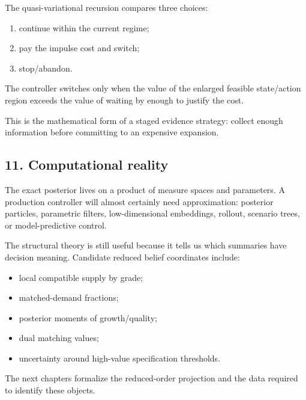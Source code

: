 The quasi-variational recursion compares three choices:

\begin{enumerate}
\def\labelenumi{\arabic{enumi}.}
\tightlist
\item
  continue within the current regime;
\item
  pay the impulse cost and switch;
\item
  stop/abandon.
\end{enumerate}

The controller switches only when the value of the enlarged feasible
state/action region exceeds the value of waiting by enough to justify the cost.

This is the mathematical form of a staged evidence strategy: collect enough
information before committing to an expensive expansion.

\subsection{11. Computational reality}\label{computational-reality}

The exact posterior lives on a product of measure spaces and parameters. A
production controller will almost certainly need approximation: posterior
particles, parametric filters, low-dimensional embeddings, rollout, scenario
trees, or model-predictive control.

The structural theory is still useful because it tells us which summaries have
decision meaning. Candidate reduced belief coordinates include:

\begin{itemize}
\tightlist
\item
  local compatible supply by grade;
\item
  matched-demand fractions;
\item
  posterior moments of growth/quality;
\item
  dual matching values;
\item
  uncertainty around high-value specification thresholds.
\end{itemize}

The next chapters formalize the reduced-order projection and the data required
to identify these objects.
